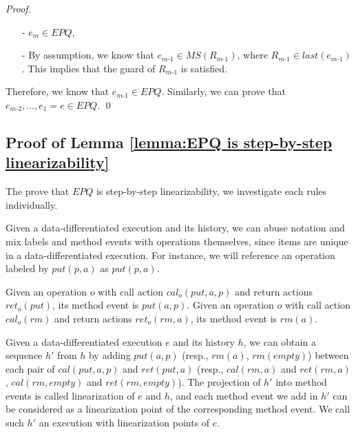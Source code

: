 \begin {proof}
\begin{itemize}
\setlength{\itemsep}{0.5pt}
\item[-] $e_m \in \textit{EPQ}$,

\item[-] By assumption, we know that $e_{\textit{m-1}} \in \textit{MS}(R_{\textit{m-1}})$, where $R_{\textit{m-1}} \in \textit{last}(e_{\textit{m-1}})$. This implies that the guard of $R_{\textit{m-1}}$ is satisfied.
\end{itemize}

Therefore, we know that $e_{\textit{m-1}} \in \textit{EPQ}$. Similarly, we can prove that $e_{\textit{m-2}},\ldots,e_1 = e \in \textit{EPQ}$. \qed
\end {proof}



\subsection{Proof of Lemma \ref{lemma:EPQ is step-by-step linearizability}}


The prove that $\textit{EPQ}$ is step-by-step linearizability, we investigate each rules individually.

Given a data-differentiated execution and its history, we can abuse notation and mix labels and method events with operations themselves, since items are unique in a data-differentiated execution. For instance, we will reference an operation labeled by $\textit{put}(p,a)$ as $\textit{put}(p,a)$.


Given an operation $o$ with call action $\textit{cal}_o (\textit{put},a,p)$ and return actions $\textit{ret}_o (\textit{put})$, its method event is $\textit{put}(a,p)$. Given an operation $o$ with call action $\textit{cal}_o (\textit{rm})$ and return actions $\textit{ret}_o (\textit{rm},a)$, its method event is $\textit{rm}(a)$.

Given a data-differentiated execution $e$ and its history $h$, we can obtain a sequence $h'$ from $h$ by adding $\textit{put}(a,p)$ (resp., $\textit{rm}(a)$, $\textit{rm}(\textit{empty})$) between each pair of $\textit{cal}(\textit{put},a,p)$ and $\textit{ret}(\textit{put},a)$ (resp., $\textit{cal}(\textit{rm},a)$ and $\textit{ret}(\textit{rm},a)$, $\textit{cal}(\textit{rm},\textit{empty})$ and $\textit{ret}(\textit{rm},\textit{empty})$). The projection of $h'$ into method events is called linearization of $e$ and $h$, and each method event we add in $h'$ can be considered as a linearization point of the corresponding method event. We call such $h'$ an execution with linearization points of $e$.


